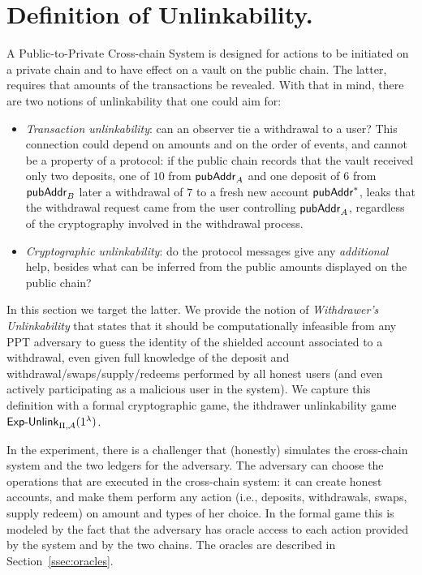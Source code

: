 \section{Definition of Unlinkability.}
\label{ssec:unlinakbility}
A Public-to-Private  Cross-chain \Payment{}  System is designed for actions
to be initiated on a private chain and to have effect on a vault on the  public chain.
The latter, requires that amounts of the transactions be revealed. With that in mind, there are two notions of unlinkability that one could aim for:
\begin{itemize}
    \item \emph{Transaction unlinkability}: can an observer  tie a
withdrawal to a user? This connection could depend on amounts and on the order of events, and cannot be a property of a protocol: if the public chain records that the vault received  only two deposits, one of  $10$ from $\mathsf{pubAddr}_{A}$  and one deposit of $6$ from $\mathsf{pubAddr}_{B}$ later  a withdrawal of $7$  to a  fresh new account  $\mathsf{pubAddr}^*$,  leaks
that the withdrawal request came from the user controlling $\mathsf{pubAddr}_{A}$, regardless of the cryptography involved in the withdrawal process.
\item \emph{Cryptographic  unlinkability}:  do the protocol messages give any \emph{additional} help, besides what can be inferred from the public amounts displayed on the public chain?
\end{itemize}

In this section we target the latter.
We provide   the notion of \emph{Withdrawer's Unlinkability} that states that it should be computationally infeasible from any PPT adversary to guess the identity of the
shielded account associated to a withdrawal, even given full knowledge of the deposit and withdrawal/swaps/supply/redeems performed by all honest users (and even actively participating as a malicious user in the system). We capture this   definition with a formal cryptographic game,  the ithdrawer unlinkability game $\mathsf{Exp\text{-}Unlink}_{\Pi,\mathcal{A}}(1^{\lambda})$.

In the experiment, there is a challenger that  (honestly) simulates the  cross-chain system and the two ledgers for the adversary. The adversary  can choose the operations that are executed  in the cross-chain system: it can create honest accounts, and make them perform any action (i.e., deposits, withdrawals,  swaps, supply redeem)
on amount and types of her choice.
In the formal game this is modeled by the fact that the adversary has oracle access to  each action provided by the system and by the two chains. The oracles are described in Section~\ref{ssec:oracles}.

